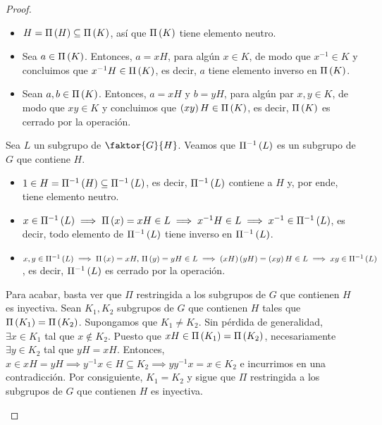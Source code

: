 \begin{proof}
\begin{enumerate}[i)]
            \begin{itemize}
                \item $H=\Pi\left( H\right) \subseteq\Pi\left( K\right)$, así que $\Pi\left( K\right)$ tiene elemento neutro.
                \item Sea $a\in\Pi\left( K\right)$. Entonces, $a=xH$, para algún $x\in K$, de modo que $x^{-1}\in K$ y concluimos que $x^{-1}H\in\Pi\left( K\right)$, es decir, $a$ tiene elemento inverso en $\Pi\left( K\right)$.
                \item Sean $a,b\in\Pi\left( K\right)$. Entonces, $a=xH$ y $b=yH$, para algún par $x,y\in K$, de modo que $xy\in K$ y concluimos que $\left( xy\right) H\in\Pi\left( K\right)$, es decir, $\Pi\left( K\right)$ es cerrado por la operación.
            \end{itemize}
            Sea $L$ un subgrupo de $\faktor{G}{H}$. Veamos que $\Pi^{-1}\left( L\right)$ es un subgrupo de $G$ que contiene $H$.
            \begin{itemize}
                \item $1\in H = \Pi^{-1}\left( H\right) \subseteq \Pi^{-1}\left( L\right)$, es decir, $\Pi^{-1}\left( L\right)$ contiene a $H$ y, por ende, tiene elemento neutro. 
                \item $x\in\Pi^{-1}\left( L\right) \implies \Pi\left( x\right)=xH\in L\implies x^{-1}H\in L\implies x^{-1}\in\Pi^{-1}\left( L\right)$, es decir, todo elemento de $\Pi^{-1}\left( L\right)$ tiene inverso en $\Pi^{-1}\left( L\right)$.
                \item $x,y\in\Pi^{-1}\left( L\right) \implies \Pi\left( x\right) = xH,\, \Pi\left( y\right)=yH\in L\implies \left( xH\right) \left( yH\right) = \left( xy\right) H\in L \implies xy\in \Pi^{-1}\left( L\right)$, es decir, $\Pi^{-1}\left( L\right)$ es cerrado por la operación.
            \end{itemize}
            Para acabar, basta ver que $\Pi$ restringida a los subgrupos de $G$ que contienen $H$ es inyectiva. Sean $K_1, K_2$ subgrupos de $G$ que contienen $H$ tales que $\Pi\left( K_1\right) = \Pi\left( K_2\right)$. Supongamos que $K_1\neq K_2$. Sin pérdida de generalidad, $\exists x\in K_1$ tal que $x\notin K_2$. Puesto que $xH\in\Pi\left( K_1\right)=\Pi\left( K_2\right)$, necesariamente $\exists y\in K_2$ tal que $yH=xH$. Entonces, $x\in xH=yH\implies y^{-1}x\in H\subseteq K_2\implies yy^{-1}x=x\in K_2$ e incurrimos en una contradicción. Por consiguiente, $K_1 = K_2$ y sigue que $\Pi$ restringida a los subgrupos de $G$ que contienen $H$ es inyectiva.
            

\end{enumerate}
\end{proof}
